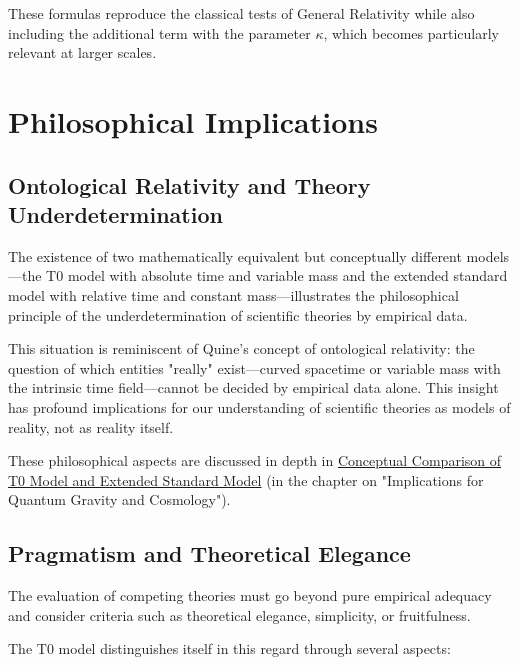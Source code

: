 \documentclass[12pt,a4paper]{article}
\begin{document}
	These formulas reproduce the classical tests of General Relativity while also including the additional term with the parameter $\kappa$, which becomes particularly relevant at larger scales.
	
	\section{Philosophical Implications}
	\label{sec:philosophical_implications}
	
	\subsection{Ontological Relativity and Theory Underdetermination}
	\label{subsec:ontological_relativity}
	
	The existence of two mathematically equivalent but conceptually different models—the T0 model with absolute time and variable mass and the extended standard model with relative time and constant mass—illustrates the philosophical principle of the underdetermination of scientific theories by empirical data.
	
	This situation is reminiscent of Quine's concept of ontological relativity: the question of which entities "really" exist—curved spacetime or variable mass with the intrinsic time field—cannot be decided by empirical data alone. This insight has profound implications for our understanding of scientific theories as models of reality, not as reality itself.
	
	These philosophical aspects are discussed in depth in \href{https://github.com/jpascher/T0-Time-Mass-Duality/tree/main/2/pdf/English/T0vsESM_ConceptualAnalysisEn.pdf}{Conceptual Comparison of T0 Model and Extended Standard Model} (in the chapter on "Implications for Quantum Gravity and Cosmology").
	
	\subsection{Pragmatism and Theoretical Elegance}
	\label{subsec:pragmatism_elegance}
	
	The evaluation of competing theories must go beyond pure empirical adequacy and consider criteria such as theoretical elegance, simplicity, or fruitfulness.
	
	The T0 model distinguishes itself in this regard through several aspects:
	
\end{document}

